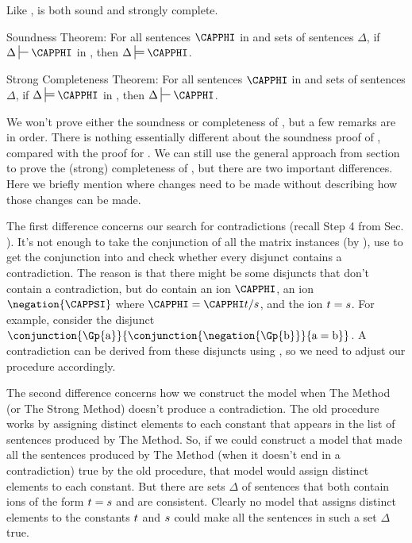 Like \GQD{}, \GQDI{} is both sound and strongly complete.
\begin{THEOREM}{ \GQDI{} Soundness Theorem:}
For all sentences $\CAPPHI$ in \GQLI{} and sets of sentences $\Delta$, if $\Delta\sststile{}{}\CAPPHI$ in \GQDI{}, then $\Delta\sdtstile{}{}\CAPPHI$.
\end{THEOREM}
\begin{THEOREM}{ \GQDI{} Strong Completeness Theorem:}
For all sentences $\CAPPHI$ in \GQLI{} and sets of sentences $\Delta$, if $\Delta\sdtstile{}{}\CAPPHI$ in \GQDI{}, then $\Delta\sststile{}{}\CAPPHI$.
\end{THEOREM}
\noindent{}We won't prove either the soundness or completeness of \GQDI{}, but a few remarks are in order.
There is nothing essentially different about the soundness proof of \GQDI{}, compared with the proof for \GQD{}.
We can still use the general approach from section  to prove the (strong) completeness of \GQDI{}, but there are two important differences.
Here we briefly mention where changes need to be made without describing how those changes can be made.

The first difference concerns our search for contradictions (recall Step 4 from Sec. ). 
It's not enough to take the conjunction of all the matrix instances (by ), use  to get the conjunction into  and check whether every disjunct contains a contradiction. 
The reason is that there might be some disjuncts that don't contain a contradiction, but do contain an ion $\CAPPHI$, an ion $\negation{\CAPPSI}$ where $\CAPPHI=\CAPPHI\variable{t}/\variable{s}$, and the ion $t=s$. 
For example, consider the disjunct $\conjunction{\Gp{\constant{a}}}{\conjunction{\negation{\Gp{\constant{b}}}}{\constant{a}=\constant{b}}}$.
A contradiction can be derived from these disjuncts using , so we need to adjust our procedure accordingly. 

The second difference concerns how we construct the model when The Method (or The Strong Method) doesn't produce a contradiction. 
The old procedure works by assigning distinct elements to each constant that appears in the list of sentences produced by The Method. 
So, if we could construct a model that made all the sentences produced by The Method (when it doesn't end in a contradiction) true by the old procedure, that model would assign distinct elements to each constant.
But there are sets $\Delta$ of \GQLI{} sentences that both contain ions of the form $t=s$ and are consistent. 
Clearly no model that assigns distinct elements to the constants $t$ and $s$ could make all the sentences in such a set $\Delta$ true. 


